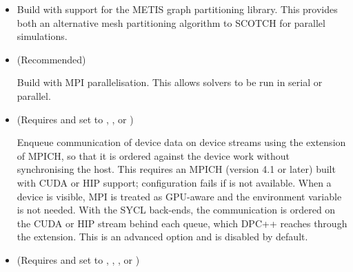 \begin{itemize}
    \item {}

    Build \nekpp with support for the METIS graph partitioning library. This
    provides both an alternative mesh partitioning algorithm to SCOTCH for
    parallel simulations.

    \item {} (Recommended)

    Build \nekpp with MPI parallelisation. This allows solvers to be run in
    serial or parallel.

    \item {} (Requires 
    and  set to , ,
     or )

    Enqueue communication of device data on device streams using the
     extension of MPICH, so that it is ordered against the
    device work without synchronising the host. This requires an MPICH
    (version 4.1 or later) built with CUDA or HIP support; configuration fails
    if  is not available. When a device is
    visible, MPI is treated as GPU-aware and the 
    environment variable is not needed. With the SYCL back-ends, the
    communication is ordered on the CUDA or HIP stream behind each queue,
    which DPC++ reaches through the
     extension. This is
    an advanced option and is disabled by default.

    \item {} (Requires  and
     set to , ,
    ,  or )


\end{itemize}
